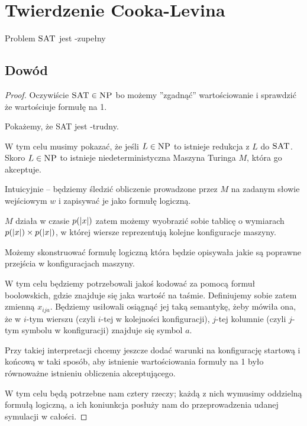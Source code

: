\section{Twierdzenie Cooka-Levina}

\begin{theorem}
	Problem \( \textsc{SAT} \) jest \np-zupełny
\end{theorem}

\subsection{Dowód}

\begin{proof}
	Oczywiście \( \textsc{SAT} \in \textsc{NP} \) bo możemy ''zgadnąć'' wartościowanie i sprawdzić że wartościuje formułę na 1.

	Pokażemy, że \textsc{SAT} jest \np-trudny.

	W tym celu musimy pokazać, że jeśli \( L \in \textsc{NP} \) to istnieje redukcja z \( L \) do \( \textsc{SAT} \).
	Skoro \( L \in \textsc{NP} \) to istnieje niedeterministyczna Maszyna Turinga \( M \), która go akceptuje.

	Intuicyjnie -- będziemy śledzić obliczenie prowadzone przez \( M \) na zadanym słowie wejściowym \( w \) i zapisywać je jako formułę logiczną.

	\( M \) działa w czasie \( p(\left\lvert x\right\rvert) \) zatem możemy wyobrazić sobie tablicę o wymiarach \( p(\left\lvert x\right\rvert) \times p(\left\lvert x\right\rvert) \), w której wiersze reprezentują kolejne konfiguracje maszyny.

	Możemy skonstruować formułę logiczną która będzie opisywała jakie są poprawne przejścia w konfiguracjach maszyny.

	W tym celu będziemy potrzebowali jakoś kodować za pomocą formuł boolowskich, gdzie znajduje się jaka wartość na taśmie. Definiujemy sobie zatem zmienną \( x_{ija} \). Będziemy usiłowali osiągnąć jej taką semantykę, żeby mówiła ona, że w \(i\)-tym wierszu (czyli \(i\)-tej w kolejności konfiguracji), \(j\)-tej kolumnie (czyli \(j\)-tym symbolu w konfiguracji) znajduje się symbol \(a\).

	Przy takiej interpretacji chcemy jeszcze dodać warunki na konfigurację startową i końcową w taki sposób, aby istnienie wartościowania formuły na 1 było równoważne istnieniu obliczenia akceptującego.

	W tym celu będą potrzebne nam cztery rzeczy; każdą z nich wymusimy oddzielną formułą logiczną, a ich koniunkcja posłuży nam do przeprowadzenia udanej symulacji w całości.


\end{proof}
